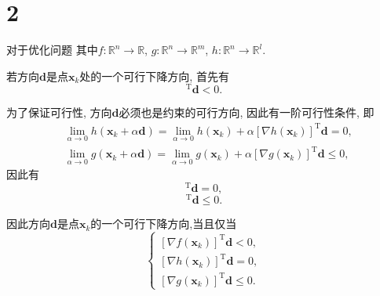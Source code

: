 \section*{2}

对于优化问题
其中$f:\mathbb{R}^n\to\mathbb{R}$, $g:\mathbb{R}^n\to\mathbb{R}^m$, $h:\mathbb{R}^n\to\mathbb{R}^l$.

若方向$\bm{d}$是点$\bm{x}_k$处的一个可行下降方向, 首先有
\begin{equation*}
    [\nabla f(\bm{x}_k)]^\mathrm{T}\bm{d}<0.
\end{equation*}

为了保证可行性, 方向$\bm{d}$必须也是约束的可行方向, 因此有一阶可行性条件, 即
\begin{align*}
    &\lim_{\alpha\to0}h(\bm{x}_k+\alpha\bm{d})=\lim_{\alpha\to0}h(\bm{x}_k)+\alpha[\nabla h(\bm{x}_k)]^\mathrm{T}\bm{d}=0, \\
    &\lim_{\alpha\to0}g(\bm{x}_k+\alpha\bm{d})=\lim_{\alpha\to0}g(\bm{x}_k)+\alpha[\nabla g(\bm{x}_k)]^\mathrm{T}\bm{d}\leq0,
\end{align*}
因此有
\begin{equation*}
    [\nabla h(\bm{x}_k)]^\mathrm{T}\bm{d}=0,
\end{equation*}
\begin{equation*}
    [\nabla g(\bm{x}_k)]^\mathrm{T}\bm{d}\leq0.
\end{equation*}

因此方向$\bm{d}$是点$\bm{x}_k$的一个可行下降方向,当且仅当
\begin{equation*}
    \begin{cases}
        [\nabla f(\bm{x}_k)]^\mathrm{T}\bm{d}<0, \\
        [\nabla h(\bm{x}_k)]^\mathrm{T}\bm{d}=0, \\
        [\nabla g(\bm{x}_k)]^\mathrm{T}\bm{d}\leq0.
    \end{cases}
\end{equation*}
